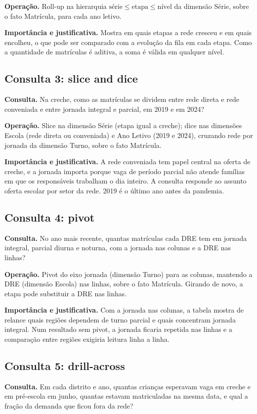 \documentclass[11pt,a4paper]{article}
\newcommand{\hier}[1]{$#1$}
\begin{document}
\textbf{Operação.} Roll-up na hierarquia \hier{\text{série} \leq \text{etapa} \leq \text{nível}} da dimensão Série, sobre o fato Matrícula, para cada ano letivo.

\textbf{Importância e justificativa.} Mostra em quais etapas a rede cresceu e em quais encolheu, o que pode ser comparado com a evolução da fila em cada etapa. Como a quantidade de matrículas é aditiva, a soma é válida em qualquer nível.

\subsection{Consulta 3: slice and dice}
\textbf{Consulta.} Na creche, como as matrículas se dividem entre rede direta e rede conveniada e entre jornada integral e parcial, em 2019 e em 2024?

\textbf{Operação.} Slice na dimensão Série (etapa igual a creche); dice nas dimensões Escola (rede direta ou conveniada) e Ano Letivo (2019 e 2024), cruzando rede por jornada da dimensão Turno, sobre o fato Matrícula.

\textbf{Importância e justificativa.} A rede conveniada tem papel central na oferta de creche, e a jornada importa porque vaga de período parcial não atende famílias em que os responsáveis trabalham o dia inteiro. A consulta responde ao assunto oferta escolar por setor da rede. 2019 é o último ano antes da pandemia.

\subsection{Consulta 4: pivot}
\textbf{Consulta.} No ano mais recente, quantas matrículas cada DRE tem em jornada integral, parcial diurna e noturna, com a jornada nas colunas e a DRE nas linhas?

\textbf{Operação.} Pivot do eixo jornada (dimensão Turno) para as colunas, mantendo a DRE (dimensão Escola) nas linhas, sobre o fato Matrícula. Girando de novo, a etapa pode substituir a DRE nas linhas.

\textbf{Importância e justificativa.} Com a jornada nas colunas, a tabela mostra de relance quais regiões dependem de turno parcial e quais concentram jornada integral. Num resultado sem pivot, a jornada ficaria repetida nas linhas e a comparação entre regiões exigiria leitura linha a linha.

\subsection{Consulta 5: drill-across}
\textbf{Consulta.} Em cada distrito e ano, quantas crianças esperavam vaga em creche e em pré-escola em junho, quantas estavam matriculadas na mesma data, e qual a fração da demanda que ficou fora da rede?
\end{document}
